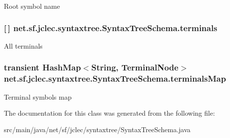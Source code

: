 Root symbol name \hypertarget{classnet_1_1sf_1_1jclec_1_1syntaxtree_1_1_syntax_tree_schema_adb1b36c1f168bd3f87dad9e1f40e7c4d}{
\subsubsection[{terminals}]{ \mbox{[}$\,$\mbox{]} net.\-sf.\-jclec.\-syntaxtree.\-Syntax\-Tree\-Schema.\-terminals\hspace{0.3cm}{\ttfamily [protected]}}}\label{classnet_1_1sf_1_1jclec_1_1syntaxtree_1_1_syntax_tree_schema_adb1b36c1f168bd3f87dad9e1f40e7c4d}
All terminals \hypertarget{classnet_1_1sf_1_1jclec_1_1syntaxtree_1_1_syntax_tree_schema_ad9f1b6f7d3e7f077d1c136989e2da3ac}{
\subsubsection[{terminals\-Map}]{\setlength{\rightskip}{0pt plus 5cm}transient Hash\-Map$<$String, {\bf Terminal\-Node}$>$ net.\-sf.\-jclec.\-syntaxtree.\-Syntax\-Tree\-Schema.\-terminals\-Map\hspace{0.3cm}{\ttfamily [protected]}}}\label{classnet_1_1sf_1_1jclec_1_1syntaxtree_1_1_syntax_tree_schema_ad9f1b6f7d3e7f077d1c136989e2da3ac}
Terminal symbols map 

The documentation for this class was generated from the following file\-:\begin{DoxyCompactItemize}
\item 
src/main/java/net/sf/jclec/syntaxtree/Syntax\-Tree\-Schema.\-java\end{DoxyCompactItemize}
